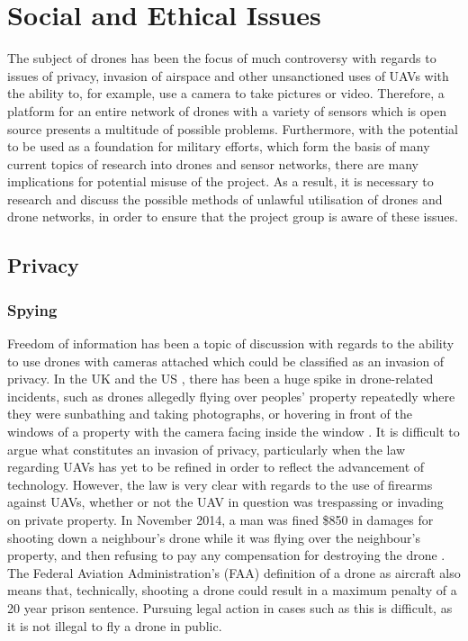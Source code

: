 \section{Social and Ethical Issues}
The subject of drones has been the focus of much controversy with regards to issues of privacy, invasion of airspace and other unsanctioned uses of UAVs with the ability to, for example, use a camera to take pictures or video. Therefore, a platform for an entire network of drones with a variety of sensors which is open source presents a multitude of possible problems. Furthermore, with the potential to be used as a foundation for military efforts, which form the basis of many current topics of research into drones and sensor networks, there are many implications for potential misuse of the project. As a result, it is necessary to research and discuss the possible methods of unlawful utilisation of drones and drone networks, in order to ensure that the project group is aware of these issues.

\subsection{Privacy}

\subsubsection{Spying}
Freedom of information has been a topic of discussion with regards to the ability to use drones with cameras attached which could be classified as an invasion of privacy. In the UK and the US \cite{rebeccarosen2013}, there has been a huge spike in drone-related incidents, such as drones allegedly flying over peoples’ property repeatedly where they were sunbathing and taking photographs, or hovering in front of the windows of a property with the camera facing inside the window \cite{maryannrusson2015}. It is difficult to argue what constitutes an invasion of privacy, particularly when the law regarding UAVs has yet to be refined in order to reflect the advancement of technology. 
However, the law is very clear with regards to the use of firearms against UAVs, whether or not the UAV in question was trespassing or invading on private property. In November 2014, a man was fined \$850 in damages for shooting down a neighbour’s drone while it was flying over the neighbour's property, and then refusing to pay any compensation for destroying the drone \cite{colinneagle2015}. The Federal Aviation Administration’s (FAA) definition of a drone as aircraft also means that, technically, shooting a drone could result in a maximum penalty of a 20 year prison sentence. Pursuing legal action in cases such as this is difficult, as it is not illegal to fly a drone in public.

